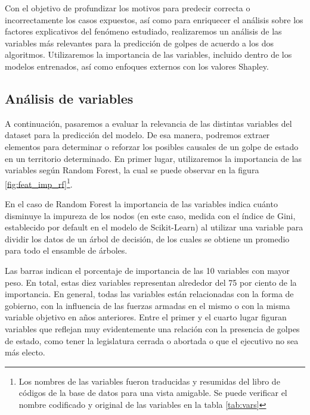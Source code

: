 \documentclass{article}
\begin{document}
Con el objetivo de profundizar los motivos para predecir correcta o incorrectamente los casos
expuestos, así como para enriquecer el análisis sobre los factores explicativos del fenómeno 
estudiado, realizaremos un análisis de las variables más relevantes para la predicción de golpes
de acuerdo a los dos algoritmos. Utilizaremos la importancia de las variables, incluido dentro
de los modelos entrenados, así como enfoques externos con los valores Shapley.

\subsection{Análisis de variables}
A continuación, pasaremos a evaluar la relevancia de las distintas variables del dataset
para la predicción del modelo. De esa manera, podremos extraer elementos para determinar
o reforzar los posibles causales de un golpe de estado en un territorio determinado. En 
primer lugar, utilizaremos la importancia de las variables según Random Forest, la cual
se puede observar en la figura \ref{fig:feat_imp_rf}\footnote{Los nombres de las variables fueron
traducidas y resumidas del libro de códigos de la base de datos para una vista amigable.
Se puede verificar el nombre codificado y original de las variables en la tabla \ref{tab:vars}}.

En el caso de Random Forest la importancia de las variables indica cuánto disminuye la impureza
de los nodos (en este caso, medida con el índice de Gini, establecido por default en el modelo de 
Scikit-Learn) al utilizar una variable para dividir los datos de un árbol de decisión, de los cuales
se obtiene un promedio para todo el ensamble de árboles.

Las barras indican el porcentaje de importancia de las 10 variables con mayor peso. En total, estas 
diez variables representan alrededor del 75 por ciento de la importancia. En general, todas las 
variables están relacionadas con la forma de gobierno, con la influencia de las fuerzas armadas en el 
mismo o con la misma variable objetivo en años anteriores. Entre el primer y el cuarto lugar figuran 
variables que reflejan muy evidentemente una relación con la presencia de golpes de estado, como 
tener la legislatura cerrada o abortada o que el ejecutivo no sea más electo.
\end{document}
